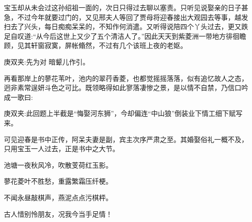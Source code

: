 \begin{parag}
    宝玉却从未会过这孙绍祖一面的，次日只得过去聊以塞责。只听见说娶亲的日子甚急，不过今年就要过门的，又见邢夫人等回了贾母将迎春接出大观园去等事，越发扫去了兴头，每日痴痴呆呆的，不知作何消遣。又听得说陪四个丫头过去，更又跌足自叹道:“从今后这世上又少了五个清洁人了。”因此天天到紫菱洲一带地方徘徊瞻顾，见其轩窗寂寞，屏帐翛然，不过有几个该班上夜的老妪。\begin{note}庚双夹:先为对 暗颦儿作引。\end{note}再看那岸上的蓼花苇叶，池内的翠荇香菱，也都觉摇摇落落，似有追忆故人之态，迥非素常逞妍斗色之可比。既领略得如此寥落凄惨之景，是以情不自禁，乃信口吟成一歌曰:\begin{note}庚双夹:此回题上半截是“悔娶河东狮”，今却偏连“中山狼”倒装业下情工细下赋写来。\end{note}\begin{note}可见迎春是书中正传，阿呆夫妻是副，宾主次序严肃之至。其婚娶俗礼一概不及，只用宝玉一人过去，正是书中之大节。\end{note}
\end{parag}


\begin{poem}
    \begin{pl}池塘一夜秋风冷，吹散芰荷红玉影。\end{pl}

    \begin{pl}蓼花菱叶不胜愁，重露繁霜压纤梗。\end{pl}

    \begin{pl}不闻永昼敲棋声，燕泥点点污棋枰。\end{pl}

    \begin{pl}古人惜别怜朋友，况我今当手足情！\end{pl}

\end{poem}


